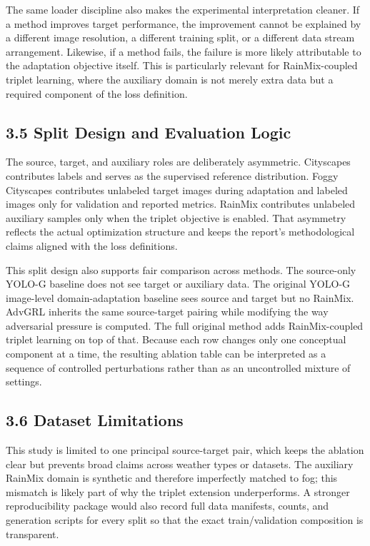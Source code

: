 \documentclass[
  11pt,
]{article}
\begin{document}
The same loader discipline also makes the experimental interpretation
cleaner. If a method improves target performance, the improvement cannot
be explained by a different image resolution, a different training
split, or a different data stream arrangement. Likewise, if a method
fails, the failure is more likely attributable to the adaptation
objective itself. This is particularly relevant for RainMix-coupled
triplet learning, where the auxiliary domain is not merely extra data
but a required component of the loss definition.

\hypertarget{split-design-and-evaluation-logic}{%
\subsection{3.5 Split Design and Evaluation
Logic}\label{split-design-and-evaluation-logic}}

The source, target, and auxiliary roles are deliberately asymmetric.
Cityscapes contributes labels and serves as the supervised reference
distribution. Foggy Cityscapes contributes unlabeled target images
during adaptation and labeled images only for validation and reported
metrics. RainMix contributes unlabeled auxiliary samples only when the
triplet objective is enabled. That asymmetry reflects the actual
optimization structure and keeps the report's methodological claims
aligned with the loss definitions.

This split design also supports fair comparison across methods. The
source-only YOLO-G baseline does not see target or auxiliary data. The
original YOLO-G image-level domain-adaptation baseline sees source and
target but no RainMix. AdvGRL inherits the same source-target pairing
while modifying the way adversarial pressure is computed. The full
original method adds RainMix-coupled triplet learning on top of that.
Because each row changes only one conceptual component at a time, the
resulting ablation table can be interpreted as a sequence of controlled
perturbations rather than as an uncontrolled mixture of settings.

\hypertarget{dataset-limitations}{%
\subsection{3.6 Dataset Limitations}\label{dataset-limitations}}

This study is limited to one principal source-target pair, which keeps
the ablation clear but prevents broad claims across weather types or
datasets. The auxiliary RainMix domain is synthetic and therefore
imperfectly matched to fog; this mismatch is likely part of why the
triplet extension underperforms. A stronger reproducibility package
would also record full data manifests, counts, and generation scripts
for every split so that the exact train/validation composition is
transparent.
\end{document}
